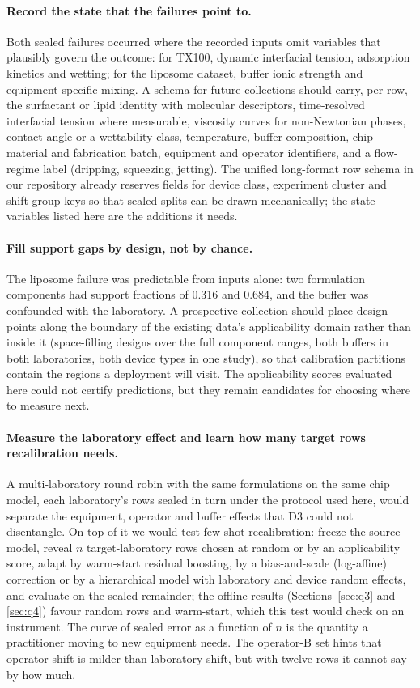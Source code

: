 \documentclass[11pt,a4paper]{article}
\newcommand{\tox}{TX100}
\begin{document}
\paragraph{Record the state that the failures point to.} Both sealed failures
occurred where the recorded inputs omit variables that plausibly govern the
outcome: for \tox{}, dynamic interfacial tension, adsorption kinetics and
wetting; for the liposome dataset, buffer ionic strength and
equipment-specific mixing. A schema for future collections should carry, per
row, the surfactant or lipid identity with molecular descriptors,
time-resolved interfacial tension where measurable, viscosity curves for
non-Newtonian phases, contact angle or a wettability class, temperature,
buffer composition, chip material and fabrication batch, equipment and
operator identifiers, and a flow-regime label (dripping, squeezing, jetting).
The unified long-format row schema in our repository already reserves fields for device class,
experiment cluster and shift-group keys so that sealed splits can be drawn
mechanically; the state variables listed here are the additions it needs.

\paragraph{Fill support gaps by design, not by chance.} The liposome failure
was predictable from inputs alone: two formulation components had support
fractions of 0.316 and 0.684, and the buffer was confounded with the
laboratory. A prospective collection should place design points along the
boundary of the existing data's applicability domain rather than inside
it (space-filling designs over the full component ranges, both buffers in
both laboratories, both device types in one study), so that calibration
partitions contain the regions a deployment will visit. The applicability
scores evaluated here could not certify predictions, but they remain
candidates for choosing where to measure next.

\paragraph{Measure the laboratory effect and learn how many target rows
recalibration needs.} A multi-laboratory round robin with the same
formulations on the same chip model, each laboratory's rows sealed in turn
under the protocol used here, would separate the equipment, operator and
buffer effects that D3 could not disentangle. On top of it we would test
few-shot recalibration: freeze the source model, reveal $n$ target-laboratory
rows chosen at random or by an applicability score, adapt by warm-start
residual boosting, by a bias-and-scale (log-affine) correction or by a
hierarchical model with laboratory and device random effects, and evaluate on
the sealed remainder; the offline results (Sections~\ref{sec:q3} and
\ref{sec:q4}) favour random rows and warm-start, which this test would check
on an instrument. The curve of sealed error as a function of $n$ is
the quantity a practitioner moving to new equipment needs. The operator-B set
hints that operator shift is milder than laboratory shift, but with twelve
rows it cannot say by how much.
\end{document}
